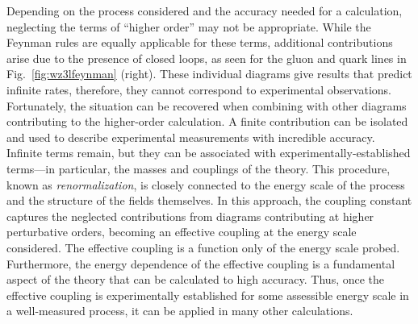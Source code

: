 Depending on the process considered and the accuracy needed for a calculation,
neglecting the terms of ``higher order'' may not be appropriate. While the 
Feynman rules are equally applicable for these terms, additional contributions
arise due to the presence of closed loops, as seen for the gluon and quark lines
in Fig.~\ref{fig:wz3lfeynman} (right). These individual diagrams give results
that predict infinite rates, therefore, they cannot correspond to experimental observations.
Fortunately, the situation can be recovered when combining with other diagrams
contributing to the higher-order calculation. A finite contribution can be
isolated and used to describe experimental measurements with incredible accuracy.
Infinite terms remain, but they can be associated with experimentally-established
terms---in particular, the masses and couplings of the theory. This procedure,
known as \emph{renormalization}, is closely connected to the energy scale of the process
and the structure of the fields themselves. In this approach, the coupling constant 
captures the neglected contributions from diagrams contributing at higher perturbative orders,
becoming an effective coupling at the energy scale considered. The effective coupling
is a function only of the energy scale probed. Furthermore, the energy dependence of the
effective coupling is a fundamental aspect of the theory that can be calculated to high
accuracy. Thus, once the effective coupling is experimentally established for some assessible energy
scale in a well-measured process, it can be applied in many other calculations.

